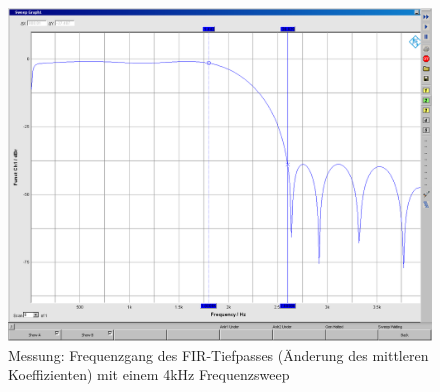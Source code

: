 \begin{figure}[h]
	\centering
	\includegraphics[width=1\linewidth]{Bilder/Attachment_G_1-TP}
	\caption{Messung: Frequenzgang des FIR-Tiefpasses (Änderung des mittleren Koeffizienten) mit einem 4kHz Frequenzsweep}
	\label{fig:Attachment_G_1-TP}
\end{figure}

 
